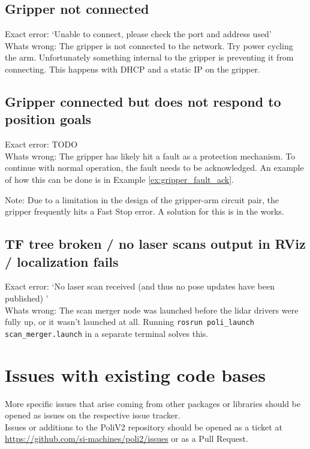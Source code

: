 \subsection{Gripper not connected}
Exact error: `Unable to connect, please check the port and address used' \\

Whats wrong: The gripper is not connected to the network. Try power cycling the arm. Unfortunately something internal to the gripper is preventing it from connecting. This happens with DHCP and a static IP on the gripper.

\subsection{Gripper connected but does not respond to position goals}
Exact error: TODO \\

Whats wrong: The gripper has likely hit a fault as a protection mechanism. 
To continue with normal operation, the fault needs to be acknowledged. 
An example of how this can be done is in Example \ref{ex:gripper_fault_ack}.

Note: Due to a limitation in the design of the gripper-arm circuit pair, the gripper frequently hits a Fast Stop error. A solution for this is in the works.


\subsection{TF tree broken / no laser scans output in RViz / localization fails}
Exact error: `No laser scan received (and thus no pose updates have been published) ' \\

Whats wrong: The scan merger node was launched before the lidar drivers were fully up, or it wasn't launched at all. Running \texttt{rosrun poli\_launch scan\_merger.launch} in a separate terminal solves this.


\section{Issues with existing code bases}

More specific issues that arise coming from other packages or libraries should be opened as issues on the respective issue tracker. \\

Issues or additions to the PoliV2 repository should be opened as a ticket at \href{https://github.com/si-machines/poli2/issues}{https://github.com/si-machines/poli2/issues} or as a Pull Request.
  